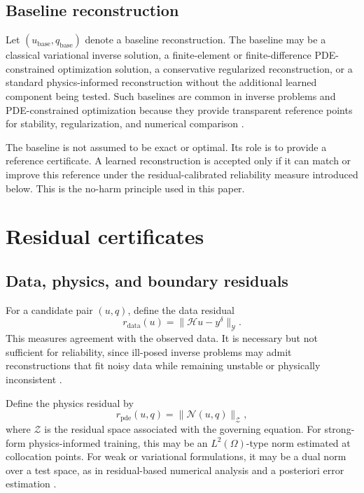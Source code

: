 \documentclass{article}
\numberwithin{equation}{section}
\theoremstyle{definition}
\begin{document}
\subsection{Baseline reconstruction}

Let \((u_{\mathrm{base}},q_{\mathrm{base}})\) denote a baseline reconstruction. The baseline may be a classical variational inverse solution, a finite-element or finite-difference PDE-constrained optimization solution, a conservative regularized reconstruction, or a standard physics-informed reconstruction without the additional learned component being tested. Such baselines are common in inverse problems and PDE-constrained optimization because they provide transparent reference points for stability, regularization, and numerical comparison \cite{EnglHankeNeubauer1996,HinzePinnauUlbrichUlbrich2009}.

The baseline is not assumed to be exact or optimal. Its role is to provide a reference certificate. A learned reconstruction is accepted only if it can match or improve this reference under the residual-calibrated reliability measure introduced below. This is the no-harm principle used in this paper.


\section{Residual certificates}
\label{sec:residual-certificates}

\subsection{Data, physics, and boundary residuals}

For a candidate pair \((u,q)\), define the data residual
\begin{equation}
r_{\mathrm{data}}(u)
=
\|\mathcal H u-y^\delta\|_{\mathcal Y}.
\label{eq:data-residual}
\end{equation}
This measures agreement with the observed data. It is necessary but not sufficient for reliability, since ill-posed inverse problems may admit reconstructions that fit noisy data while remaining unstable or physically inconsistent \cite{EnglHankeNeubauer1996,Hansen2010}.

Define the physics residual by
\begin{equation}
r_{\mathrm{pde}}(u,q)
=
\|\mathcal N(u,q)\|_{\mathcal Z},
\label{eq:pde-residual}
\end{equation}
where \(\mathcal Z\) is the residual space associated with the governing equation. For strong-form physics-informed training, this may be an \(L^2(\Omega)\)-type norm estimated at collocation points. For weak or variational formulations, it may be a dual norm over a test space, as in residual-based numerical analysis and a posteriori error estimation \cite{Verfuerth2013,BangerthRannacher2003}.
\end{document}

